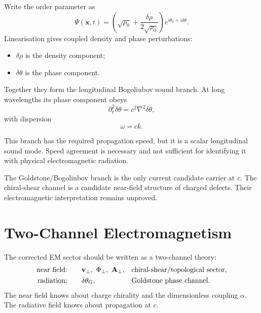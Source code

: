 \documentclass[11pt,a4paper]{article}
\begin{document}
Write the order parameter as
\begin{equation}
    \Psi(\mathbf{x},t)
    =
    \left(\sqrt{\rho_0}
    +\frac{\delta\rho}{2\sqrt{\rho_0}}\right)
    e^{i\theta_0+i\delta\theta}.
    \label{eq:psi_expand}
\end{equation}
Linearisation gives coupled density and phase perturbations:
\begin{itemize}[leftmargin=2em]
    \item $\delta\rho$ is the density component;
    \item $\delta\theta$ is the phase component.
\end{itemize}
Together they form the longitudinal Bogoliubov sound branch.  At long
wavelengths its phase component obeys
\begin{equation}
    \partial_t^2\delta\theta
    =
    c^2\nabla^2\delta\theta,
    \label{eq:goldstone_wave}
\end{equation}
with dispersion
\begin{equation}
    \omega = ck .
    \label{eq:goldstone_disp}
\end{equation}

This branch has the required propagation speed, but it is a scalar
longitudinal sound mode.  Speed agreement is necessary and not sufficient
for identifying it with physical electromagnetic radiation.

\begin{resultbox}
The Goldstone/Bogoliubov branch is the only current candidate carrier at
$c$.  The chiral-shear channel is a candidate near-field structure of
charged defects.  Their electromagnetic interpretation remains unproved.
\end{resultbox}

\section{Two-Channel Electromagnetism}
\label{sec:two_channel}

The corrected EM sector should be written as a two-channel theory:
\begin{align}
    \hbox{near field:}\qquad
    &\mathbf{v}_\perp,\ \Phi_\perp,\ \mathbf{A}_\perp,
    &&\hbox{chiral-shear/topological sector},\\
    \hbox{radiation:}\qquad
    &\delta\theta_{\rm G},
    &&\hbox{Goldstone phase channel}.
    \label{eq:two_channel}
\end{align}
The near field knows about charge chirality and the dimensionless coupling
$\alpha$.  The radiative field knows about propagation at $c$.
\end{document}
